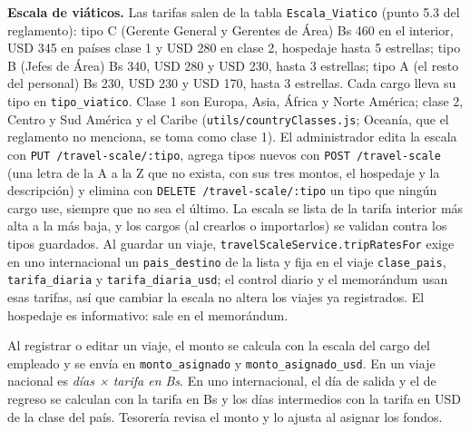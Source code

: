 \documentclass[11pt,letterpaper]{article}
\newcommand{\code}[1]{\nolinkurl{#1}}
\begin{document}
\textbf{Escala de viáticos.} Las tarifas salen de la tabla \code{Escala_Viatico} (punto 5.3 del reglamento): tipo C (Gerente General y Gerentes de Área) Bs 460 en el interior, USD 345 en países clase 1 y USD 280 en clase 2, hospedaje hasta 5 estrellas; tipo B (Jefes de Área) Bs 340, USD 280 y USD 230, hasta 3 estrellas; tipo A (el resto del personal) Bs 230, USD 230 y USD 170, hasta 3 estrellas. Cada cargo lleva su tipo en \code{tipo_viatico}. Clase 1 son Europa, Asia, África y Norte América; clase 2, Centro y Sud América y el Caribe (\code{utils/countryClasses.js}; Oceanía, que el reglamento no menciona, se toma como clase 1). El administrador edita la escala con \code{PUT /travel-scale/:tipo}, agrega tipos nuevos con \code{POST /travel-scale} (una letra de la A a la Z que no exista, con sus tres montos, el hospedaje y la descripción) y elimina con \code{DELETE /travel-scale/:tipo} un tipo que ningún cargo use, siempre que no sea el último. La escala se lista de la tarifa interior más alta a la más baja, y los cargos (al crearlos o importarlos) se validan contra los tipos guardados. Al guardar un viaje, \code{travelScaleService.tripRatesFor} exige en uno internacional un \code{pais_destino} de la lista y fija en el viaje \code{clase_pais}, \code{tarifa_diaria} y \code{tarifa_diaria_usd}; el control diario y el memorándum usan esas tarifas, así que cambiar la escala no altera los viajes ya registrados. El hospedaje es informativo: sale en el memorándum.

Al registrar o editar un viaje, el monto se calcula con la escala del cargo del empleado y se envía en \code{monto_asignado} y \code{monto_asignado_usd}. En un viaje nacional es \emph{días × tarifa en Bs}. En uno internacional, el día de salida y el de regreso se calculan con la tarifa en Bs y los días intermedios con la tarifa en USD de la clase del país. Tesorería revisa el monto y lo ajusta al asignar los fondos.
\end{document}
